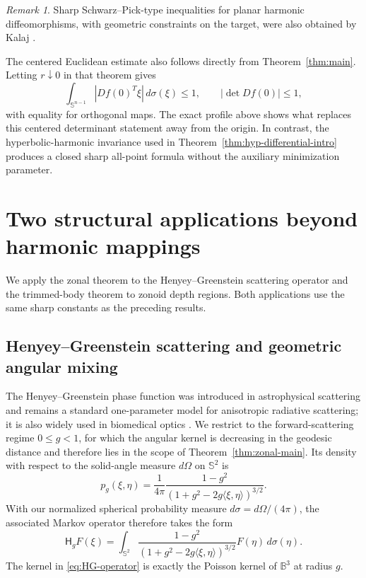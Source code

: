 \documentclass[11pt,reqno]{amsart}
\theoremstyle{remark}
\newtheorem{remark}[theorem]{Remark}
\newcommand{\Sph}{\mathbb S}
\begin{document}
\begin{remark}
Sharp Schwarz--Pick-type inequalities for planar harmonic diffeomorphisms,
with geometric constraints on the target, were also obtained by Kalaj
\cite{Kalaj2019Sharp}.
\end{remark}

The centered Euclidean estimate also follows directly from Theorem~\ref{thm:main}.  Letting $r\downarrow0$ in that theorem
gives
\[
 \int_{\Sph^{n-1}}|Df(0)^T\xi|\,d\sigma(\xi)\le1,
 \qquad
 |\det Df(0)|\le1,
\]
with equality for orthogonal maps.  The exact profile above shows what replaces
this centered determinant statement away from the origin.  In contrast, the
hyperbolic-harmonic invariance used in Theorem~\ref{thm:hyp-differential-intro} produces
a closed sharp all-point formula without the auxiliary minimization parameter.


\section{Two structural applications beyond harmonic mappings}
\label{sec:structural-applications}

We apply the zonal theorem to the Henyey--Greenstein scattering operator
and the trimmed-body theorem to zonoid depth regions.  Both applications
use the same sharp constants as the preceding results.

\subsection{Henyey--Greenstein scattering and geometric angular mixing}

The Henyey--Greenstein phase function was introduced in astrophysical
scattering \cite{HenyeyGreenstein} and remains a standard one-parameter
model for anisotropic radiative scattering; it is also widely used in
biomedical optics \cite{CalabroBigio}.  We restrict to the forward-scattering
regime $0\le g<1$, for which the angular kernel is decreasing in the
geodesic distance and therefore lies in the scope of
Theorem~\ref{thm:zonal-main}.  Its density with respect to the solid-angle
measure $d\Omega$ on $\mathbb S^2$ is
\[
 p_g(\xi,\eta)
 =
 \frac{1}{4\pi}
 \frac{1-g^2}
 {(1+g^2-2g\langle\xi,\eta\rangle)^{3/2}}.
\]
With our normalized spherical probability measure
$d\sigma=d\Omega/(4\pi)$, the associated Markov operator therefore takes
the form
\begin{equation}\label{eq:HG-operator}
 \mathsf H_gF(\xi)
 =
 \int_{\mathbb S^2}
 \frac{1-g^2}
 {(1+g^2-2g\langle\xi,\eta\rangle)^{3/2}}
 F(\eta)\,d\sigma(\eta).
\end{equation}
The kernel in \eqref{eq:HG-operator} is exactly the Poisson kernel of
$\mathbb B^3$ at radius $g$.
\end{document}

